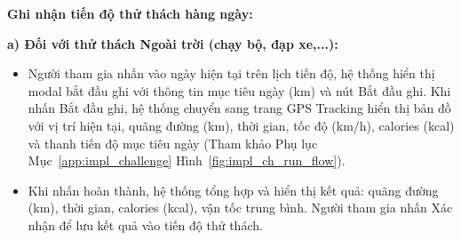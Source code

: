 \textbf{Ghi nhận tiến độ thử thách hàng ngày:}

\textbf{a) Đối với thử thách Ngoài trời (chạy bộ, đạp xe,...):}
\begin{itemize}
    \item Người tham gia nhấn vào ngày hiện tại trên lịch tiến độ, hệ thống hiển thị modal bắt đầu ghi với thông tin mục tiêu ngày (km) và nút Bắt đầu ghi. Khi nhấn Bắt đầu ghi, hệ thống chuyển sang trang GPS Tracking hiển thị bản đồ với vị trí hiện tại, quãng đường (km), thời gian, tốc độ (km/h), calories (kcal) và thanh tiến độ mục tiêu ngày (Tham khảo Phụ lục Mục~\ref{app:impl_challenge} Hình~\ref{fig:impl_ch_run_flow}).


    \item Khi nhấn hoàn thành, hệ thống tổng hợp và hiển thị kết quả: quãng đường (km), thời gian, calories (kcal), vận tốc trung bình. Người tham gia nhấn Xác nhận để lưu kết quả vào tiến độ thử thách.

\end{itemize}

